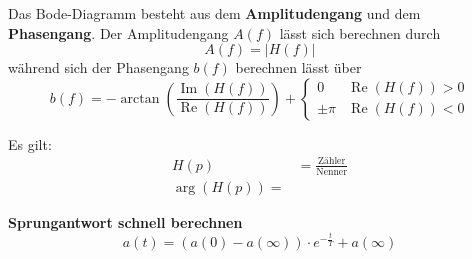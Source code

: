 \documentclass[12pt, a4paper]{scrartcl}
\begin{document}
Das Bode-Diagramm besteht aus dem \textbf{Amplitudengang} und dem \textbf{Phasengang}. Der Amplitudengang \(A(f)\) lässt sich berechnen durch
\[A(f) = |H(f)|\]
während sich der Phasengang \(b(f)\) berechnen lässt über
\[b(f) = -\arctan\left(\frac{\operatorname{Im}(H(f))}{\operatorname{Re}(H(f))}\right) +
  \begin{cases}
    0 & \operatorname{Re}(H(f)) > 0\\
    \pm \pi & \operatorname{Re}(H(f)) < 0
  \end{cases}
\]

 Es gilt:
\begin{align*}
  H(p) &= \frac{\textrm{Zähler}}{\textrm{Nenner}}\\
  \operatorname{arg}(H(p)) = 
\end{align*}

\textbf{Sprungantwort schnell berechnen}
\[a(t) = (a(0) - a(\infty)) \cdot e^{-\frac{t}{T}} + a(\infty)\]
\end{document}
